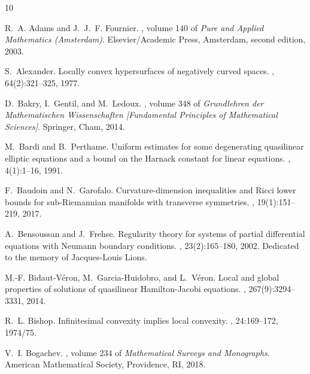 \documentclass[10pt, a4paper, reqno, oneside]{amsart}
\theoremstyle{plain}
\theoremstyle{definition}
\theoremstyle{plain}
\theoremstyle{definition}
\theoremstyle{plain}
\renewcommand{\=}{:=}
\begin{document}
\medskip

%
%


\begin{thebibliography}{10}

R.~A. Adams and J.~J.~F. Fournier.
, volume 140 of {\em Pure and Applied Mathematics
  (Amsterdam)}.
\newblock Elsevier/Academic Press, Amsterdam, second edition, 2003.

S.~Alexander.
\newblock Locally convex hypersurfaces of negatively curved spaces.
, 64(2):321--325, 1977.

D.~Bakry, I.~Gentil, and M.~Ledoux.
, volume
  348 of {\em Grundlehren der Mathematischen Wissenschaften [Fundamental
  Principles of Mathematical Sciences]}.
\newblock Springer, Cham, 2014.

M.~Bardi and B.~Perthame.
\newblock Uniform estimates for some degenerating quasilinear elliptic
  equations and a bound on the {H}arnack constant for linear equations.
, 4(1):1--16, 1991.

F.~Baudoin and N.~Garofalo.
\newblock Curvature-dimension inequalities and {R}icci lower bounds for
  sub-{R}iemannian manifolds with transverse symmetries.
, 19(1):151--219, 2017.

A.~Bensoussan and J.~Frehse.
\newblock Regularity theory for systems of partial differential equations with
  {N}eumann boundary conditions.
, 23(2):165--180, 2002.
\newblock Dedicated to the memory of Jacques-Louis Lions.

M.-F. Bidaut-V\'{e}ron, M.~Garcia-Huidobro, and L.~V\'{e}ron.
\newblock Local and global properties of solutions of quasilinear
  {H}amilton-{J}acobi equations.
, 267(9):3294--3331, 2014.

R.~L. Bishop.
\newblock Infinitesimal convexity implies local convexity.
, 24:169--172, 1974/75.

V.~I. Bogachev.
, volume 234 of {\em Mathematical
  Surveys and Monographs}.
\newblock American Mathematical Society, Providence, RI, 2018.


\end{thebibliography}
\end{document}
